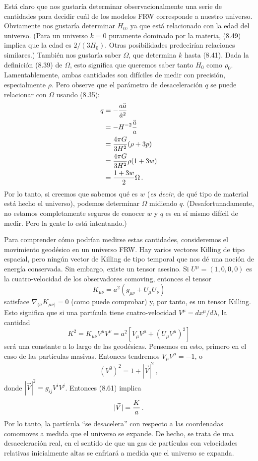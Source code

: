 \documentclass[11pt,b5paper,openany,twoside]{book}
\newcommand{\mn}{{\mu\nu}}
\begin{document}
Está claro que nos gustaría determinar observacionalmente una serie de cantidades para decidir cuál de los modelos FRW corresponde a nuestro universo.
Obviamente nos gustaría determinar $H_0$, ya que está relacionado con la edad del universo.
(Para un universo $k=0$ puramente dominado por la materia, (8.49) implica que la edad es $2/(3H_0)$.
Otras posibilidades predecirían relaciones similares.)
También nos gustaría saber $\Omega$, que determina $k$ hasta (8.41).
Dada la definición (8.39) de $\Omega$, esto significa que queremos saber tanto $H_0$ como $\rho_0$.
Lamentablemente, ambas cantidades son difíciles de medir con precisión, especialmente $\rho$.
Pero observe que el parámetro de desaceleración $q$ se puede relacionar con $\Omega$ usando (8.35):
\begin{align}
q  &=  -{{a\ddot a}\over {\dot a^2}} \notag \\
&=  -H^{-2}{{\ddot a}\over a} \notag \\
&=  {{4\pi G}\over {3H^2}}(\rho+3p) \notag \\
&=  {{4\pi G}\over {3H^2}}\rho(1+3w) \notag \\
&=  {{1+3w}\over 2}\Omega\,.\label{8.60}
\end{align}
Por lo tanto, si creemos que sabemos qué es $w$ ({\it es decir}, de qué tipo de material está hecho el universo), podemos determinar $\Omega$ midiendo $q$.
(Desafortunadamente, no estamos completamente seguros de conocer $w$ y $q$ es en sí mismo difícil de medir.
Pero la gente lo está intentando.)

Para comprender cómo podrían medirse estas cantidades, consideremos el movimiento geodésico en un universo FRW.
Hay varios vectores Killing de tipo espacial, pero ningún vector de Killing de tipo temporal que nos dé una noción de energía conservada.
Sin embargo, existe un tensor asesino.
Si $U^\mu=(1,0,0,0)$ es la cuatro-velocidad de los observadores comoving, entonces el tensor
\begin{equation}
K_\mn = a^2(g_\mn + U_\mu U_\nu)\label{8.61}
\end{equation}
satisface $\nabla_{(\sigma}K_{\mn)}=0$ (como puede comprobar) y, por tanto, es un tensor Killing.
Esto significa que si una partícula tiene cuatro-velocidad $V^\mu = dx^\mu/d\lambda$, la cantidad
\begin{equation}
K^2 = K_\mn V^\mu V^\nu = a^2[V_\mu V^\mu + (U_\mu V^\mu)^2]\label{8.62}
\end{equation}
será una constante a lo largo de las geodésicas.
Pensemos en esto, primero en el caso de las partículas masivas.
Entonces tendremos $V_\mu V^\mu =-1$, o
\begin{equation}
(V^0)^2 = 1+|\vec V|^2\ ,\label{8.63}
\end{equation}
donde $|\vec V|^2 = g_{ij}V^iV^j$.
Entonces (8.61) implica
\begin{equation}
|\vec V| = {{K}\over a}\,.\label{8.64}
\end{equation}
Por lo tanto, la partícula ``se desacelera'' con respecto a las coordenadas comomoves a medida que el universo se expande.
De hecho, se trata de una desaceleración real, en el sentido de que un gas de partículas con velocidades relativas inicialmente altas se enfriará a medida que el universo se expanda.
\end{document}
